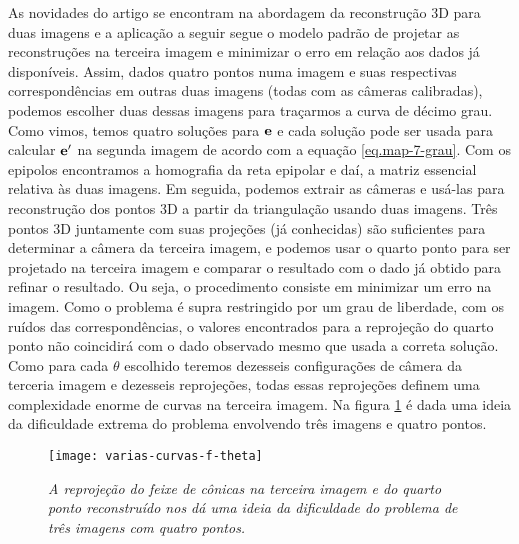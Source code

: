 As novidades do artigo se encontram na abordagem da reconstrução 3D para duas imagens e a aplicação a seguir segue o modelo padrão de projetar as reconstruções na terceira imagem e minimizar o erro em relação aos dados já disponíveis. Assim, dados quatro pontos numa imagem e suas respectivas correspondências em outras duas imagens (todas com as câmeras calibradas), podemos escolher duas dessas imagens para traçarmos a curva de décimo grau. Como vimos, temos quatro soluções para   ${\bf e}$ e cada solução pode ser usada para calcular ${\bf e'}$ na segunda imagem de acordo com a equação \ref{eq.map-7-grau}. Com os epipolos encontramos a homografia da reta epipolar  e daí, a matriz essencial relativa às duas imagens. Em seguida, podemos extrair as câmeras e usá-las para reconstrução dos pontos 3D a partir da triangulação usando duas imagens. Três pontos 3D juntamente com suas projeções (já conhecidas) são suficientes para determinar a câmera da terceira imagem, e podemos usar o quarto ponto para ser projetado na terceira imagem e comparar o resultado com o dado já obtido para refinar o resultado. Ou seja, o procedimento consiste em minimizar um erro na imagem. Como o problema é supra restringido por um grau de liberdade, com os ruídos das correspondências, o valores encontrados para a reprojeção do quarto ponto não coincidirá com o dado observado mesmo que usada a correta solução. Como para cada $\theta$ escolhido teremos dezesseis configurações de câmera da terceria imagem e dezesseis reprojeções, todas essas reprojeções definem uma complexidade enorme de curvas na terceira imagem. Na figura \ref{curvas-f(theta)} é dada uma ideia da dificuldade extrema do problema envolvendo três imagens e quatro pontos. 

\begin{figure}[!htb]
\centering
\texttt{[image: varias-curvas-f-theta]}
\caption{\textit{A reprojeção do feixe de cônicas na terceira imagem e do quarto ponto reconstruído nos dá uma ideia da dificuldade do problema de três imagens com quatro pontos.}}
\label{curvas-f(theta)}
\end{figure}

